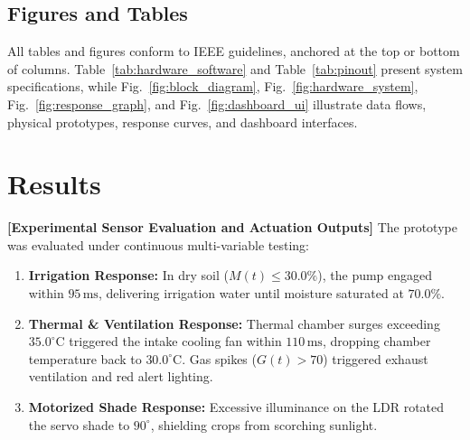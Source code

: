 \documentclass[conference]{IEEEtran}
\begin{document}
\subsection{Figures and Tables}
All tables and figures conform to IEEE guidelines, anchored at the top or bottom of columns. Table~\ref{tab:hardware_software} and Table~\ref{tab:pinout} present system specifications, while Fig.~\ref{fig:block_diagram}, Fig.~\ref{fig:hardware_system}, Fig.~\ref{fig:response_graph}, and Fig.~\ref{fig:dashboard_ui} illustrate data flows, physical prototypes, response curves, and dashboard interfaces.

\section{Results}

\noindent \textbf{[Experimental Sensor Evaluation and Actuation Outputs]} The prototype was evaluated under continuous multi-variable testing:
\begin{enumerate}
    \item \textbf{Irrigation Response:} In dry soil ($M(t) \le 30.0\%$), the pump engaged within $95\,\text{ms}$, delivering irrigation water until moisture saturated at $70.0\%$.
    \item \textbf{Thermal \& Ventilation Response:} Thermal chamber surges exceeding $35.0^\circ\text{C}$ triggered the intake cooling fan within $110\,\text{ms}$, dropping chamber temperature back to $30.0^\circ\text{C}$. Gas spikes ($G(t) > 70$) triggered exhaust ventilation and red alert lighting.
    \item \textbf{Motorized Shade Response:} Excessive illuminance on the LDR rotated the servo shade to $90^\circ$, shielding crops from scorching sunlight.
\end{enumerate}
\end{document}
